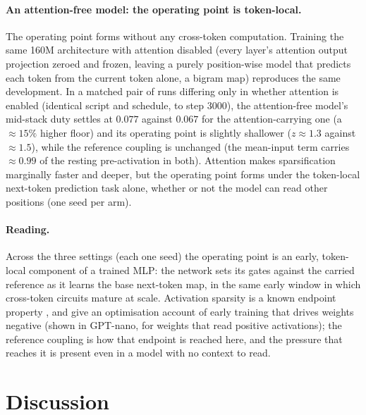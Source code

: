 \documentclass[11pt]{article}
\begin{document}
\paragraph{An attention-free model: the operating point is token-local.}
The operating point forms without any cross-token computation. Training
the same 160M architecture with attention disabled (every layer's
attention output projection zeroed and frozen, leaving a purely
position-wise model that predicts each token from the current token
alone, a bigram map) reproduces the same development. In a matched pair of runs differing
only in whether attention is enabled (identical script and schedule, to
step 3000), the attention-free model's mid-stack duty settles at $0.077$
against $0.067$ for the attention-carrying one (a $\approx 15\%$ higher
floor) and its operating point is slightly shallower ($z \approx 1.3$
against $\approx 1.5$), while the reference coupling is unchanged
(the mean-input term carries $\approx 0.99$ of the resting pre-activation in both). Attention makes
sparsification marginally faster and deeper, but the operating point forms under the token-local next-token
prediction task alone, whether or not the model can read other positions
(one seed per arm).

\paragraph{Reading.} Across the three settings (each one seed) the
operating point is an
early, token-local component of a trained MLP: the network sets its
gates against the carried reference as it learns the base next-token
map, in the same early window in which cross-token circuits mature at
scale. Activation sparsity is a known endpoint property
\citep{li2023lazy,szatkowski2025}, and \citet{shvetsov2026} give an
optimisation account of early training that drives weights negative
(shown in GPT-nano, for weights that read positive activations); the
reference coupling is how that endpoint is reached here, and the pressure that reaches it is present even in a model
with no context to read.

\section{Discussion}
\end{document}
